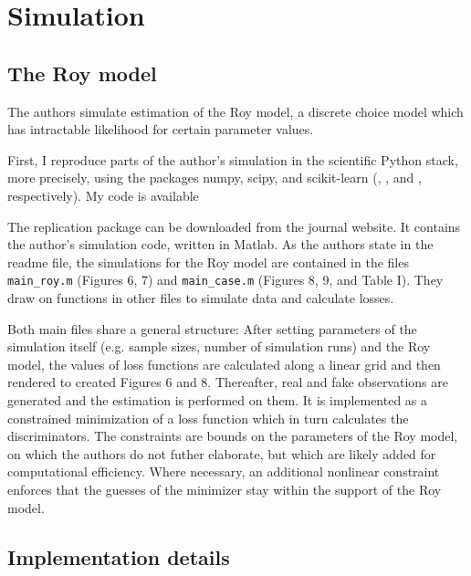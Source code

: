 \section{Simulation}
\label{sec:simulation}


\subsection{The Roy model}
\label{sec:roy}

The authors simulate estimation of the Roy model, a discrete choice model which has intractable likelihood for certain parameter values.

First, I reproduce parts of the author's simulation in the scientific Python stack, more precisely, using the packages numpy, scipy, and scikit-learn (\textcite{harris2020array}, \textcite{2020SciPy-NMeth}, and \textcite{scikit-learn}, respectively).
My code is available %

The replication package can be downloaded from the journal website.
It contains the author's simulation code, written in Matlab. %
As the authors state in the readme file, the simulations for the Roy model are contained in the files \texttt{main\_roy.m} (Figures 6, 7) and \texttt{main\_case.m} (Figures 8, 9, and Table I).
They draw on functions in other files to simulate data and calculate losses.

Both main files share a general structure:
After setting parameters of the simulation itself (e.g. sample sizes, number of simulation runs) and the Roy model, the values of loss functions are calculated along a linear grid and then rendered to created Figures 6 and 8.
Thereafter, real and fake observations are generated and the estimation is performed on them.
It is implemented as a constrained minimization of a loss function which in turn calculates the discriminators. %
The constraints are bounds on the parameters of the Roy model, on which the authors do not futher elaborate, but which are likely added for computational efficiency. %
Where necessary, an additional nonlinear constraint enforces that the guesses of the minimizer stay within the support of the Roy model.



\subsection{Implementation details}
\label{sec:Implementation}

